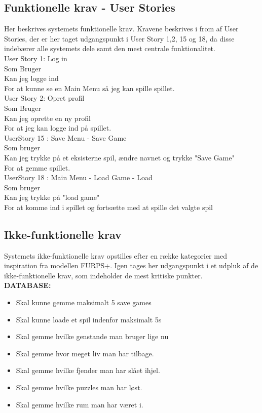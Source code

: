 \subsection{Funktionelle krav - User Stories}
Her beskrives systemets funktionelle krav. Kravene beskrives i from af User Stories, der er her taget udgangspunkt i User Story 1,2, 15 og 18, da disse indebærer alle systemets dele samt den mest centrale funktionalitet.\\  
 
User Story 1: Log in \\
  Som Bruger \\
  Kan jeg logge ind \\
  For at kunne se en Main Menu så jeg kan spille spillet. \\
  
User Story 2: Opret profil \\
  Som Bruger \\
  Kan jeg oprette en ny profil \\
  For at jeg kan logge ind på spillet. \\
  
UserStory 15 : Save Menu - Save Game\\
  Som bruger \\
  Kan jeg trykke på et eksisterne spil, ændre navnet og trykke "Save Game" \\
  For at gemme spillet.\\

  
UserStory 18 : Main Menu - Load Game - Load\\
  Som bruger \\
  Kan jeg trykke på "load game" \\
  For at komme ind i spillet og fortsætte med at spille det valgte spil\\


\subsection{Ikke-funktionelle krav}
Systemets ikke-funktionelle krav opstilles efter en række kategorier med inspiration fra modellen FURPS+. Igen tages her udgangspunkt i et udpluk af de ikke-funktionelle krav, som indeholder de mest kritiske punkter.\\

\textbf{DATABASE:}

\begin{itemize}

\item Skal kunne gemme maksimalt 5 save games
\item Skal kunne loade et spil indenfor maksimalt 5s
\item Skal gemme hvilke genstande man bruger lige nu
\item Skal gemme hvor meget liv man har tilbage.
\item Skal gemme hvilke fjender man har slået ihjel.
\item Skal gemme hvilke puzzles man har løst.
\item Skal gemme hvilke rum man har været i.
\end{itemize}

